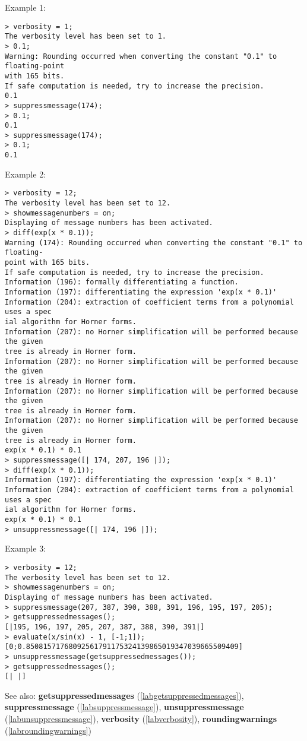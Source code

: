 \noindent Example 1: 
\begin{center}\begin{minipage}{15cm}\begin{Verbatim}[frame=single]
> verbosity = 1;
The verbosity level has been set to 1.
> 0.1;
Warning: Rounding occurred when converting the constant "0.1" to floating-point 
with 165 bits.
If safe computation is needed, try to increase the precision.
0.1
> suppressmessage(174);
> 0.1;
0.1
> suppressmessage(174);
> 0.1;
0.1
\end{Verbatim}
\end{minipage}\end{center}
\noindent Example 2: 
\begin{center}\begin{minipage}{15cm}\begin{Verbatim}[frame=single]
> verbosity = 12;
The verbosity level has been set to 12.
> showmessagenumbers = on; 
Displaying of message numbers has been activated.
> diff(exp(x * 0.1));
Warning (174): Rounding occurred when converting the constant "0.1" to floating-
point with 165 bits.
If safe computation is needed, try to increase the precision.
Information (196): formally differentiating a function.
Information (197): differentiating the expression 'exp(x * 0.1)'
Information (204): extraction of coefficient terms from a polynomial uses a spec
ial algorithm for Horner forms.
Information (207): no Horner simplification will be performed because the given 
tree is already in Horner form.
Information (207): no Horner simplification will be performed because the given 
tree is already in Horner form.
Information (207): no Horner simplification will be performed because the given 
tree is already in Horner form.
Information (207): no Horner simplification will be performed because the given 
tree is already in Horner form.
exp(x * 0.1) * 0.1
> suppressmessage([| 174, 207, 196 |]);
> diff(exp(x * 0.1));
Information (197): differentiating the expression 'exp(x * 0.1)'
Information (204): extraction of coefficient terms from a polynomial uses a spec
ial algorithm for Horner forms.
exp(x * 0.1) * 0.1
> unsuppressmessage([| 174, 196 |]);
\end{Verbatim}
\end{minipage}\end{center}
\noindent Example 3: 
\begin{center}\begin{minipage}{15cm}\begin{Verbatim}[frame=single]
> verbosity = 12;
The verbosity level has been set to 12.
> showmessagenumbers = on;
Displaying of message numbers has been activated.
> suppressmessage(207, 387, 390, 388, 391, 196, 195, 197, 205);
> getsuppressedmessages();
[|195, 196, 197, 205, 207, 387, 388, 390, 391|]
> evaluate(x/sin(x) - 1, [-1;1]);
[0;0.85081571768092561791175324139865019347039665509409]
> unsuppressmessage(getsuppressedmessages());
> getsuppressedmessages();
[| |]
\end{Verbatim}
\end{minipage}\end{center}
See also: \textbf{getsuppressedmessages} (\ref{labgetsuppressedmessages}), \textbf{suppressmessage} (\ref{labsuppressmessage}), \textbf{unsuppressmessage} (\ref{labunsuppressmessage}), \textbf{verbosity} (\ref{labverbosity}), \textbf{roundingwarnings} (\ref{labroundingwarnings})
